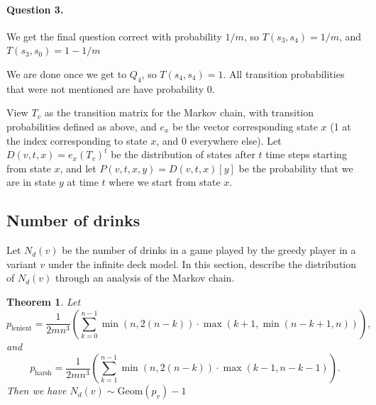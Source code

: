 \documentclass[12pt]{article}
\newcommand{\Geom}{\text{Geom}}
\newtheorem{theorem}{Theorem}[section]
\theoremstyle{definition}
\begin{document}
\paragraph{Question 3.} We get the final question correct with probability $1/m$, so $T(s_{3}, s_{4}) = 1/m$, and $T(s_{3}, s_{0}) = 1-1/m$

We are done once we get to $Q_4$, so $T(s_{4}, s_{4}) =1$. All transition probabilities that were not mentioned are have probability 0.

View $T_v$ as the transition matrix for the Markov chain, with transition probabilities defined as above, and $e_{x}$ be the vector corresponding state $x$ (1 at the index corresponding to state $x$, and 0 everywhere else).  Let $D(v, t, x) = e_{x}(T_v)^t$ be the distribution of states after $t$ time steps starting from state $x$, and let $P(v, t, x, y) = D(v, t, x)[y]$ be the probability that we are in state $y$ at time $t$ where we start from state $x$. 

\subsection{Number of drinks}
Let $N_d(v)$ be the number of drinks in a game played by the greedy player in a variant $v$ under the infinite deck model. In this section, describe the distribution of $N_d(v)$ through an analysis of the Markov chain.

\begin{theorem}
    Let 
    $$p_{\text{lenient}} = \frac{1}{2mn^3}\left(\sum_{k=0}^{n-1} \min(n, 2(n-k)) \cdot \max(k+1, \min(n-k+1, n))\right),$$
    and
    $$p_{\text{harsh}} = \frac{1}{2mn^3}\left(\sum_{k=1}^{n-1} \min(n, 2(n-k))\cdot \max(k-1, n-k-1)\right).$$ Then we have $N_d(v) \sim \Geom(p_v) - 1$
    
\end{theorem}
\end{document}
